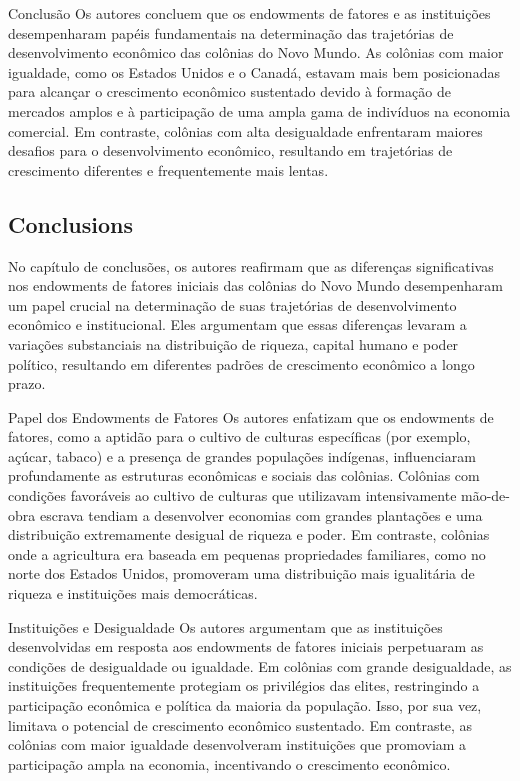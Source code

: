 \documentclass[a4paper,12pt]{article}[abntex2]
\begin{document}
Conclusão
Os autores concluem que os endowments de fatores e as instituições desempenharam papéis fundamentais na determinação das trajetórias de desenvolvimento econômico das colônias do Novo Mundo. As colônias com maior igualdade, como os Estados Unidos e o Canadá, estavam mais bem posicionadas para alcançar o crescimento econômico sustentado devido à formação de mercados amplos e à participação de uma ampla gama de indivíduos na economia comercial. Em contraste, colônias com alta desigualdade enfrentaram maiores desafios para o desenvolvimento econômico, resultando em trajetórias de crescimento diferentes e frequentemente mais lentas.

\subsection*{\textbf{Conclusions}}

No capítulo de conclusões, os autores reafirmam que as diferenças significativas nos endowments de fatores iniciais das colônias do Novo Mundo desempenharam um papel crucial na determinação de suas trajetórias de desenvolvimento econômico e institucional. Eles argumentam que essas diferenças levaram a variações substanciais na distribuição de riqueza, capital humano e poder político, resultando em diferentes padrões de crescimento econômico a longo prazo.

Papel dos Endowments de Fatores
Os autores enfatizam que os endowments de fatores, como a aptidão para o cultivo de culturas específicas (por exemplo, açúcar, tabaco) e a presença de grandes populações indígenas, influenciaram profundamente as estruturas econômicas e sociais das colônias. Colônias com condições favoráveis ao cultivo de culturas que utilizavam intensivamente mão-de-obra escrava tendiam a desenvolver economias com grandes plantações e uma distribuição extremamente desigual de riqueza e poder. Em contraste, colônias onde a agricultura era baseada em pequenas propriedades familiares, como no norte dos Estados Unidos, promoveram uma distribuição mais igualitária de riqueza e instituições mais democráticas.

Instituições e Desigualdade
Os autores argumentam que as instituições desenvolvidas em resposta aos endowments de fatores iniciais perpetuaram as condições de desigualdade ou igualdade. Em colônias com grande desigualdade, as instituições frequentemente protegiam os privilégios das elites, restringindo a participação econômica e política da maioria da população. Isso, por sua vez, limitava o potencial de crescimento econômico sustentado. Em contraste, as colônias com maior igualdade desenvolveram instituições que promoviam a participação ampla na economia, incentivando o crescimento econômico.
\end{document}
